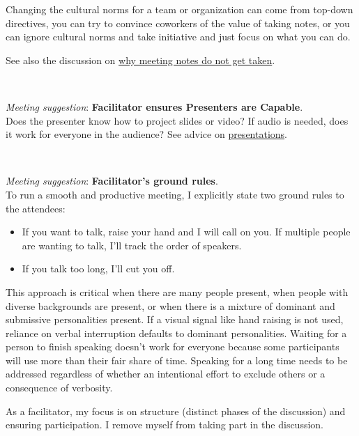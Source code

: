 Changing the cultural norms for a team or organization can come from top-down directives, you can try to convince coworkers of the value of taking notes, or you can ignore cultural norms and take initiative and just focus on what you can do.


See also the discussion on \hyperref[sec:written-comm-does-not-happen]{why meeting notes do not get taken}.

\ \\
\begin{samepage}
\textit{Meeting suggestion}: \textbf{Facilitator ensures Presenters are Capable}.\\
Does the presenter know how to project slides or video? If audio is needed, does it work for everyone in the audience?
See advice on \hyperref[sec:bad-presentations]{presentations}.
\end{samepage}

\ \\
\begin{samepage}
\textit{Meeting suggestion}: \textbf{Facilitator's ground rules}.\\
To run a smooth and productive meeting, I explicitly state two ground rules to the attendees:
\end{samepage}
\begin{itemize}
    \item If you want to talk, raise your hand and I will call on you. If multiple people are wanting to talk, I'll track the order of speakers.
    \item If you talk too long, I'll cut you off. 
\end{itemize}
This approach is critical when there are many people present, when people with diverse backgrounds are present, or when there is a mixture of dominant and submissive personalities present. 
If a visual signal like hand raising is not used, reliance on verbal interruption defaults to dominant personalities. Waiting for a person to finish speaking doesn't work for everyone because some participants will use more than their fair share of time. Speaking for a long time needs to be addressed regardless of whether an intentional effort to exclude others or a consequence of verbosity.

As a facilitator, my focus is on structure (distinct phases of the discussion) and ensuring participation. I remove myself from taking part in the discussion.

